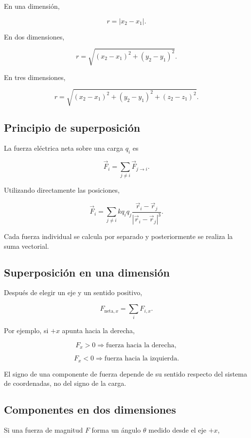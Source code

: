 En una dimensión,

\[
\boxed{r=|x_2-x_1|}.
\]

En dos dimensiones,

\[
\boxed{
r=
\sqrt{(x_2-x_1)^2+(y_2-y_1)^2}
}.
\]

En tres dimensiones,

\[
\boxed{
r=
\sqrt{
(x_2-x_1)^2+
(y_2-y_1)^2+
(z_2-z_1)^2
}
}.
\]


\subsection{Principio de superposición}

La fuerza eléctrica neta sobre una carga \(q_i\) es

\[
\boxed{
\vec F_i=\sum_{j\neq i}\vec F_{j\to i}
}.
\]

Utilizando directamente las posiciones,

\[
\boxed{
\vec F_i
=
\sum_{j\neq i}
kq_iq_j
\frac{\vec r_i-\vec r_j}
{|\vec r_i-\vec r_j|^3}
}.
\]

Cada fuerza individual se calcula por separado y posteriormente se realiza la suma vectorial.


\subsection{Superposición en una dimensión}

Después de elegir un eje y un sentido positivo,

\[
\boxed{F_{\text{neta},x}=\sum_iF_{i,x}}.
\]

Por ejemplo, si \(+x\) apunta hacia la derecha,

\[
F_x>0\Longrightarrow\text{fuerza hacia la derecha},
\]

\[
F_x<0\Longrightarrow\text{fuerza hacia la izquierda}.
\]

\begin{advertencia}
El signo de una componente de fuerza depende de su sentido respecto del sistema de coordenadas, no del signo de la carga.
\end{advertencia}


\subsection{Componentes en dos dimensiones}

Si una fuerza de magnitud \(F\) forma un ángulo \(\theta\) medido desde el eje \(+x\),

